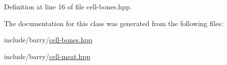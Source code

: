 Definition at line 16 of file cell-\/bones.\+hpp.



The documentation for this class was generated from the following files\+:\begin{DoxyCompactItemize}
\item 
include/barry/\hyperlink{cell-bones_8hpp}{cell-\/bones.\+hpp}\item 
include/barry/\hyperlink{cell-meat_8hpp}{cell-\/meat.\+hpp}\end{DoxyCompactItemize}
